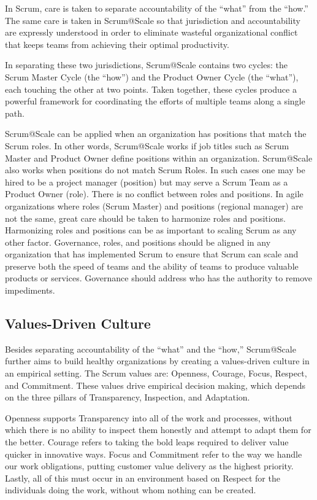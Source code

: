 \documentclass[12pt,a4paper,parskip=full]{scrartcl}
\begin{document}
In Scrum, care is taken to separate accountability of the ``what'' from the ``how.'' The same care is taken in Scrum@Scale so that jurisdiction and accountability are expressly understood in order to eliminate wasteful organizational conflict that keeps teams from achieving their optimal productivity.

In separating these two jurisdictions, Scrum@Scale contains two cycles: the Scrum Master Cycle (the ``how'') and the Product Owner Cycle (the ``what''), each touching the other at two points. Taken together, these cycles produce a powerful framework for coordinating the efforts of multiple teams along a single path.

Scrum@Scale can be applied when an organization has positions that match the Scrum roles. In other words, Scrum@Scale works if job titles such as Scrum Master and Product Owner define positions within an organization.  Scrum@Scale also works when positions do not match Scrum Roles. In such cases one may be hired to be a project manager (position) but may serve a Scrum Team as a Product Owner (role). There is no conflict between roles and positions. In agile organizations where roles (Scrum Master) and positions (regional manager) are not the same, great care should be taken to harmonize roles and positions. Harmonizing roles and positions can be as important to scaling Scrum as any other factor. Governance, roles, and positions should be aligned in any organization that has implemented Scrum to ensure that Scrum can scale and preserve both the speed of teams and the ability of teams to produce valuable products or services. Governance should address who has the authority to remove impediments.

\subsection{Values-Driven Culture}

Besides separating accountability of the ``what'' and the ``how,'' Scrum@Scale further aims to build healthy organizations by creating a values-driven culture in an empirical setting. The Scrum values are: Openness, Courage, Focus, Respect, and Commitment. These values drive empirical decision making, which depends on the three pillars of Transparency, Inspection, and Adaptation.

Openness supports Transparency into all of the work and processes, without which there is no ability to inspect them honestly and attempt to adapt them for the better. Courage refers to taking the bold leaps required to deliver value quicker in innovative ways.
Focus and Commitment refer to the way we handle our work obligations, putting customer value delivery as the highest priority. Lastly, all of this must occur in an environment based on Respect for the individuals doing the work, without whom nothing can be created.
\end{document}
